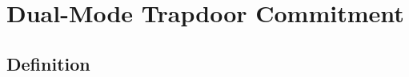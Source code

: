 \section{Dual-Mode Trapdoor Commitment}

\subsection{Definition}

\begin{definition}
    
\end{definition}